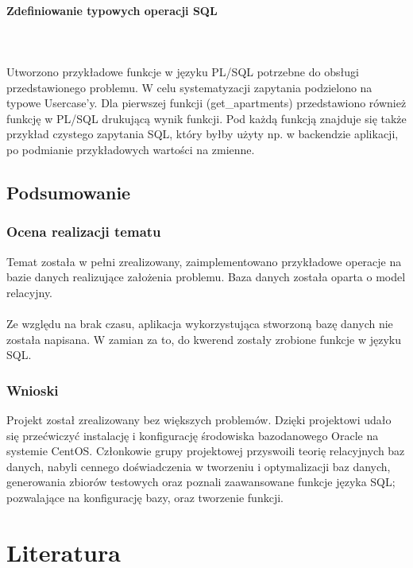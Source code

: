 \documentclass[polish, 11pt]{article}
\begin{document}
		    \paragraph{Zdefiniowanie typowych operacji SQL}\mbox{}\\\\
                Utworzono przykładowe funkcje w języku PL/SQL potrzebne do obsługi przedstawionego problemu.
                W celu systematyzacji zapytania podzielono na typowe Usercase'y.
                Dla pierwszej funkcji (get\_apartments) przedstawiono również funkcję w PL/SQL drukującą wynik funkcji.
                Pod każdą funkcją znajduje się także przykład czystego zapytania SQL, który byłby
				użyty np. w backendzie aplikacji, po podmianie przykładowych wartości na zmienne.
				
				

    \subsection{Podsumowanie}
	    \subsubsection{Ocena realizacji tematu}
		    Temat została w pełni zrealizowany, zaimplementowano przykładowe operacje na bazie danych realizujące założenia problemu.
		    Baza danych została oparta o model relacyjny.\\\\
		    Ze względu na brak czasu, aplikacja wykorzystująca stworzoną bazę danych nie została napisana. W zamian za to, do kwerend zostały zrobione
		    funkcje w języku SQL.
	    
		\subsubsection{Wnioski}
			Projekt został zrealizowany bez większych problemów. Dzięki projektowi udało się przećwiczyć instalację i konfigurację środowiska
			bazodanowego Oracle na systemie CentOS. Członkowie grupy projektowej przyswoili teorię relacyjnych baz danych, nabyli cennego
			doświadczenia w tworzeniu i optymalizacji baz danych, generowania zbiorów testowych oraz poznali zaawansowane funkcje języka SQL; 
			pozwalające na konfigurację bazy, oraz tworzenie funkcji.

\section{Literatura}
\end{document}
